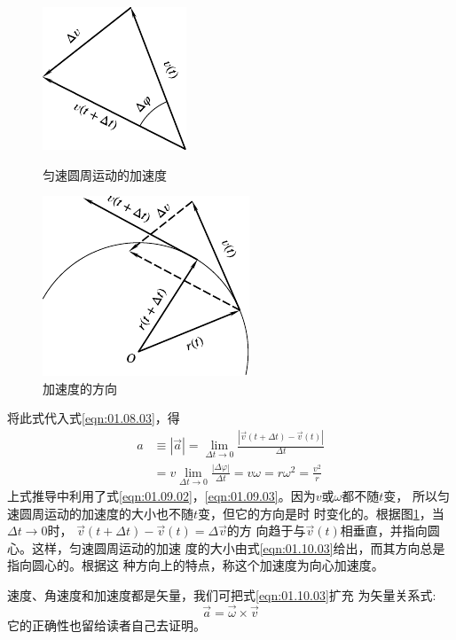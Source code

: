 \begin{figure}[!h]
  \small\centering
  \begin{minipage}[b]{14em}
    \includegraphics{figure/fig01.22}
    \vspace{1em}
    \caption{匀速圆周运动的加速度}
    \label{fig:01.22}
  \end{minipage}
  \begin{minipage}[b]{14em}
    \centering
    \includegraphics{figure/fig01.23}
    \caption{加速度的方向}
    \label{fig:01.23}
  \end{minipage}
\end{figure}
\noindent 将此式代入式\eqref{eqn:01.08.03}，得
\begin{equation}\label{eqn:01.10.03}
  \begin{aligned}
    a & \equiv|\vec{a}|=\lim _{\Delta t \rightarrow 0} \frac{|\vec{v}\left(t+\Delta t\right)-\vec{v}\left(t\right)|}{\Delta t} \\
      & =v\lim_{\Delta t \rightarrow 0} \frac{|\Delta \varphi|}{\Delta t}=v \omega=r \omega^{2}=\frac{v^{2}}{r}
  \end{aligned}
\end{equation}\vspace{0.5em}
上式推导中利用了式\eqref{eqn:01.09.02}，\eqref{eqn:01.09.03}。因为$v$或$\omega$都不随$t$变，
所以匀速圆周运动的加速度的大小也不随$t$变，但它的方向是时
时变化的。根据图\ref{fig:01.23}，当$\Delta t\rightarrow 0$时，
$\vec{v}\left(t+ \Delta t\right)-\vec{v}\left(t\right)=\Delta\vec{v}$的方
向趋于与$\vec{v}\left(t\right)$相垂直，并指向圆心。这样，匀速圆周运动的加速
度的大小由式\eqref{eqn:01.10.03}给出，而其方向总是指向圆心的。根据这
种方向上的特点，称这个加速度为向心加速度。

速度、角速度和加速度都是矢量，我们可把式\eqref{eqn:01.10.03}扩充
为矢量关系式:
\clearpage
~\vspace{-1.56em}
\begin{equation}\label{eqn:01.10.04}
  \vec{a}= \vec{\omega}\times \vec{v}
\end{equation}
它的正确性也留给读者自己去证明。
